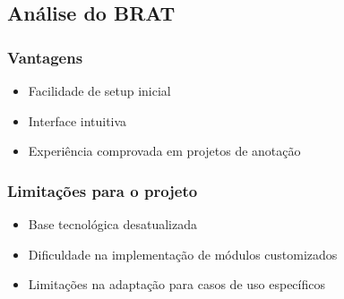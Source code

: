 \subsection{Análise do BRAT}

\subsubsection{Vantagens}
\begin{itemize}
    \item Facilidade de setup inicial
    \item Interface intuitiva
    \item Experiência comprovada em projetos de anotação
\end{itemize}

\subsubsection{Limitações para o projeto}
\begin{itemize}
    \item Base tecnológica desatualizada
    \item Dificuldade na implementação de módulos customizados
    \item Limitações na adaptação para casos de uso específicos
\end{itemize}